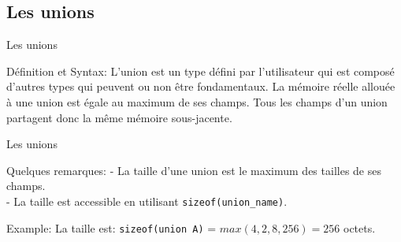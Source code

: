 \documentclass{beamer}
\begin{document}
\begin{darkframes}


 
 
  	\subsection{Les unions}
  	\begin{frame}{Les unions}
  		\begin{block}{Définition et Syntax:}
  			L'union est un type défini par l'utilisateur qui est composé d'autres types qui peuvent ou non être fondamentaux. La mémoire réelle allouée à une union est égale au maximum de ses champs. Tous les champs d'un union partagent donc la même mémoire sous-jacente.
  			\unionSyntax
  		\end{block}

  	\end{frame}
  	
  	\begin{frame}{Les unions}
  		\begin{alertblock}{Quelques remarques:}
  			- La taille d'une union est le maximum des tailles de ses champs. \\
  			- La taille est accessible en utilisant \alert{\texttt{sizeof(union\_name)}}. \\
  		\end{alertblock}
  		\begin{exampleblock}{Example:}
  			\unionExmp
  			La taille est: \texttt{sizeof(union A)} = $max(4, 2, 8, 256) = 256$ octets.
  		\end{exampleblock}
  	\end{frame}


\end{darkframes}
\end{document}
